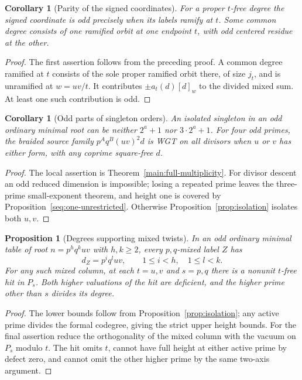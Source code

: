 \documentclass[11pt,a4paper]{article}
\numberwithin{equation}{section}
\newtheorem{proposition}[theorem]{Proposition}
\newtheorem{corollary}[theorem]{Corollary}
\theoremstyle{remark}
\begin{document}
\begin{corollary}[Parity of the signed coordinates]\label{fam:M:9.5}\label{deep:ram-parity}
For a proper $t$-free degree the signed coordinate is odd precisely
when its labels ramify at $t$. Some common degree consists of one
ramified orbit at one endpoint $t$, with odd centered residue at
the other.
\end{corollary}
\begin{proof}
The first assertion follows from the preceding proof. A common degree
ramified at $t$ consists of the sole proper ramified orbit there, of
size $j_t$, and is unramified at $w=uv/t$. It contributes
$\pm a_t(d)[d]_w$ to the divided mixed sum. At least one such
contribution is odd.
\end{proof}

\begin{corollary}[Odd parts of singleton orders]\label{fam:M:9.6}\label{r6:two-fermat}\label{nov:seven}\label{thirteen}
An isolated singleton in an odd ordinary minimal root can be neither
$2^a+1$ nor $3\cdot2^a+1$. For four odd primes, the braided source
family $p^Aq^B(uv)^2d$ is WGT on all divisors when $u$ or $v$ has
either form, with any coprime square-free $d$.
\end{corollary}
\begin{proof}
The local assertion is Theorem~\ref{main:full-multiplicity}.
For divisor descent an odd reduced dimension is impossible; losing
a repeated prime leaves the three-prime small-exponent theorem, and
height one is covered by Proposition~\ref{seq:one-unrestricted}.
Otherwise Proposition~\ref{prop:isolation} isolates both $u,v$.
\end{proof}

\begin{proposition}[Degrees supporting mixed twists]\label{fam:M:9.7}\label{fourm:mixed-degrees}
In an odd ordinary minimal table of root $n=p^h q^kuv$ with $h,k\ge2$,
every $p,q$-mixed label $Z$ has
\[
 d_Z=p^i q^l uv,\qquad 1\le i<h,\quad 1\le l<k .
\]
For any such mixed column, at each $t=u,v$ and $s=p,q$ there is a
nonunit $t$-free hit in $P_s$. Both higher valuations of the hit are
deficient, and the higher prime other than $s$ divides its degree.
\end{proposition}
\begin{proof}
The lower bounds follow from Proposition~\ref{prop:isolation};
any active prime divides the formal codegree, giving the strict upper
height bounds. For the final assertion reduce the orthogonality of the
mixed column with the vacuum on $P_s$ modulo $t$. The hit omits $t$,
cannot have full height at either active prime by defect zero, and
cannot omit the other higher prime by the same two-axis argument.
\end{proof}
\end{document}
